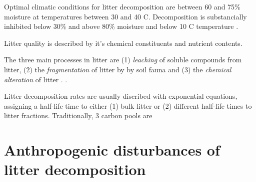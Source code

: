 Optimal climatic conditions for litter decomposition are between 60 and 75\% moisture at temperatures between 30 and 40 \textdegree C. Decomposition is substancially inhibited below 30\% and above 80\% moisture and below 10 \textdegree C temperature \citep{Prescott2010}. 

Litter quality is described by it's chemical constituents and nutrient contents. 

The three main processes in litter are (1) \emph{leaching} of soluble compounds from litter, (2) the \emph{fragmentation} of litter by by soil fauna and (3) the \emph{chemical alteration} of litter \citep[pp. 152f]{Chapin2002}. .

Litter decomposition rates are usually discribed with exponential equations, assigning a half-life time to either (1) bulk litter or (2) different half-life times to litter fractions. Traditionally, 3 carbon pools are 
\cite{Berg1980}

\section{Anthropogenic disturbances of litter decomposition}



